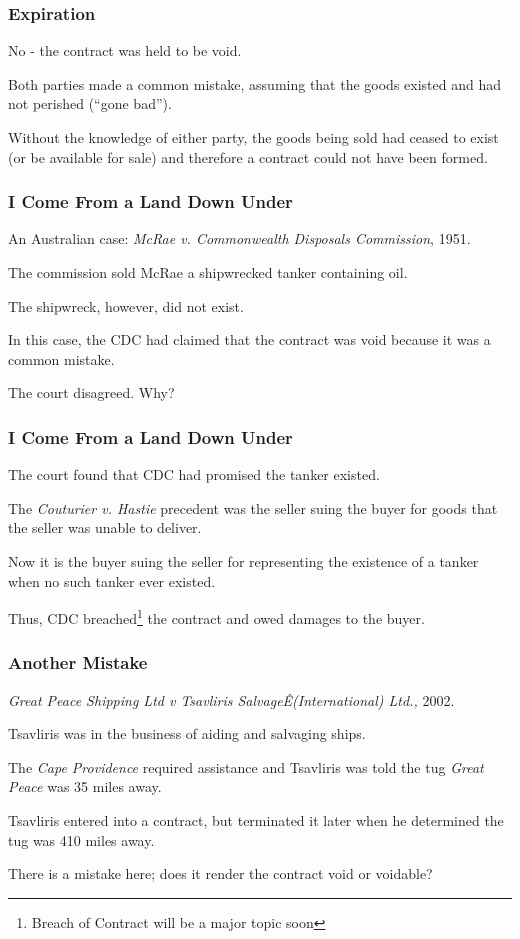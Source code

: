 \begin{frame}
\frametitle{Expiration}

No - the contract was held to be void.

Both parties made a common mistake, assuming that the goods existed and had not perished (``gone bad'').

Without the knowledge of either party, the goods being sold had ceased to exist (or be available for sale) and therefore a contract could not have been formed.

\end{frame}



\begin{frame}
\frametitle{I Come From a Land Down Under}

An Australian case: \textit{McRae v. Commonwealth Disposals Commission}, 1951.

The commission sold McRae a shipwrecked tanker containing oil.

The shipwreck, however, did not exist.

In this case, the CDC had claimed that the contract was void because it was a common mistake.

The court disagreed. Why?

\end{frame}



\begin{frame}
\frametitle{I Come From a Land Down Under}

The court found that CDC had promised the tanker existed. 

The \textit{Couturier v. Hastie} precedent was the seller suing the buyer for goods that the seller was unable to deliver.

Now it is the buyer suing the seller for representing the existence of a tanker when no such tanker ever existed.

Thus, CDC breached\footnote{Breach of Contract will be a major topic soon} the contract and owed damages to the buyer.

\end{frame}



\begin{frame}
\frametitle{Another Mistake}
\textit{Great Peace Shipping Ltd v Tsavliris SalvageÊ(International) Ltd.,} 2002.

Tsavliris was in the business of aiding and salvaging ships.

The \textit{Cape Providence} required assistance and Tsavliris was told the tug \textit{Great Peace} was 35 miles away.

Tsavliris entered into a contract, but terminated it later when he determined the tug was 410 miles away.

There is a mistake here; does it render the contract void or voidable?

\end{frame}



